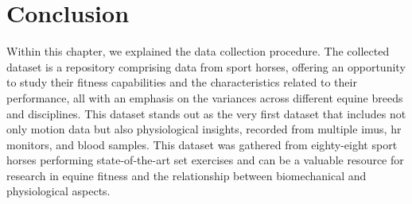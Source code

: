 \section{Conclusion}
\label{sec:conclusion}

Within this chapter, we explained the data collection procedure. The collected dataset is a repository comprising data from sport horses, offering an opportunity to study their fitness capabilities and the characteristics related to their performance, all with an emphasis on the variances across different equine breeds and disciplines. This dataset stands out as the very first dataset that includes not only motion data but also physiological insights, recorded from multiple \gls{imu}s, \gls{hr} monitors, and blood samples. This dataset was gathered from eighty-eight sport horses performing state-of-the-art \gls{set} exercises and can be a valuable resource for research in equine fitness and the relationship between biomechanical and physiological aspects.